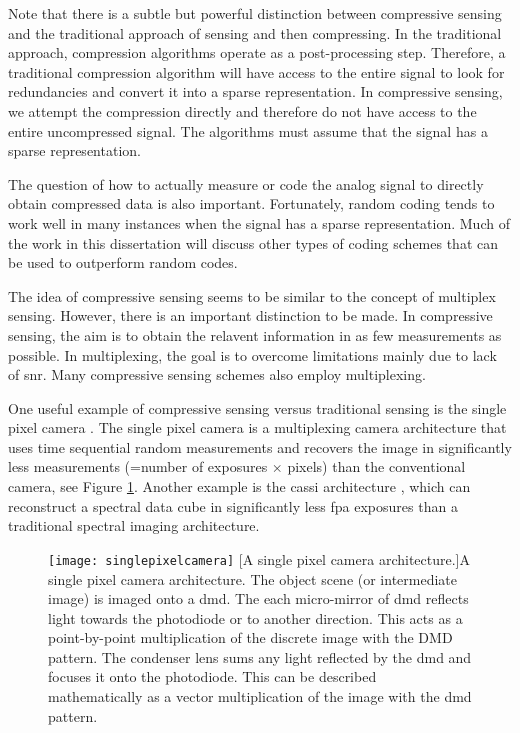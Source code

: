 Note that there is a subtle but powerful distinction between compressive sensing and the traditional approach of sensing and then compressing. In the traditional approach, compression algorithms operate as a post-processing step. Therefore, a traditional compression algorithm will have access to the entire signal to look for redundancies and convert it into a sparse representation. In compressive sensing, we attempt the compression directly and therefore do not have access to the entire uncompressed signal. The algorithms must assume that the signal has a sparse representation. 

The question of how to actually measure or code the analog signal to directly obtain compressed data is also important. Fortunately, random coding tends to work well in many instances when the signal has a sparse representation. Much of the work in this dissertation will discuss other types of coding schemes that can be used to outperform random codes. 

The idea of compressive sensing seems to be similar to the concept of multiplex sensing. However, there is an important distinction to be made. In compressive sensing, the aim is to obtain the relavent information in as few measurements as possible. In multiplexing, the goal is to overcome limitations mainly due to lack of \gls{snr}. Many compressive sensing schemes also employ multiplexing.

One useful example of compressive sensing versus traditional sensing is the single pixel camera \cite{duarte2008single}. The single pixel camera is a multiplexing camera architecture that uses time sequential random measurements and recovers the image in significantly less measurements (=number of exposures $\times$ pixels) than the conventional camera, see Figure \ref{fig:singlepixelcamera}. Another example is the \gls{cassi} architecture \cite{wagadarikar2008single}, which can reconstruct a spectral data cube in significantly less \gls{fpa} exposures than a traditional spectral imaging architecture. 


\begin{figure}
    \texttt{[image: singlepixelcamera]}
    [A single pixel camera architecture.]{A single pixel camera architecture. The object scene (or intermediate image) is imaged onto a \gls{dmd}. The each micro-mirror of \gls{dmd} reflects light towards the photodiode or to another direction. This acts as a point-by-point multiplication of the discrete image with the DMD pattern. The condenser lens sums any light reflected by the \gls{dmd} and focuses it onto the photodiode. This can be described mathematically as a vector multiplication of the image with the \gls{dmd} pattern. }
    \label{fig:singlepixelcamera}
\end{figure}

